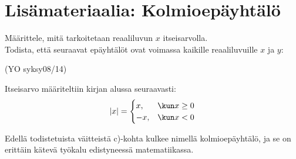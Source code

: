 \section{Lisämateriaalia: Kolmioepäyhtälö}

\begin{esimerkki}
Määrittele, mitä tarkoitetaan reaaliluvun $x$ itseisarvolla. \\
Todista, että seuraavat epäyhtälöt ovat voimassa kaikille reaaliluvuille $x$ ja $y$:
\begin{alakohdat}
\end{alakohdat}
(YO syksy08/14)
\begin{esimratk}
Itseisarvo määriteltiin kirjan alussa seuraavasti:
\[
|x|=\begin{cases}
	x, & \kun x \geq 0 \\
	-x, & \kun x < 0
\end{cases} 
\]
\begin{alakohdat}
\end{alakohdat}
\end{esimratk}
\end{esimerkki}

Edellä todistetuista väitteistä c)-kohta kulkee nimellä kolmioepäyhtälö, ja se on erittäin
kätevä työkalu edistyneessä matematiikassa.
